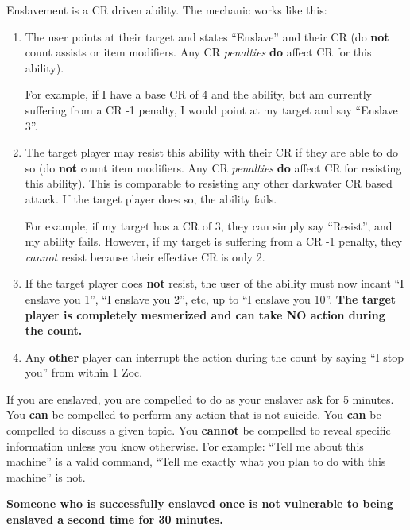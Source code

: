 \documentclass[green]{elementals}
\begin{document}
\name{\gEnslave{}} 

Enslavement is a CR driven ability. The mechanic works like this:

\begin{enumerate}
 \item The user points at their target and states ``Enslave'' and their CR (do {\bf not} count assists or item modifiers. Any CR \emph{penalties} {\bf do} affect CR for this ability). 
 
 For example, if I have a base CR of 4 and the ability, but am currently suffering from a CR -1 penalty, I would point at my target and say ``Enslave 3''. 
 
 \item The target player may resist this ability with their CR if they are able to do so (do {\bf not} count item modifiers. Any CR \emph{penalties} {\bf do} affect CR for resisting this ability). This is comparable to resisting any other darkwater CR based attack. If the target player does so, the ability fails. 
 
 For example, if my target has a CR of 3, they can simply say ``Resist'', and my ability fails.
 However, if my target is suffering from a CR -1 penalty, they \emph{cannot} resist because their effective CR is only 2.
 
 \item If the target player does {\bf not} resist, the user of the ability must now incant ``I enslave you 1'', ``I enslave you 2'', etc, up to ``I enslave you 10''. {\bf The target player is completely mesmerized and can take NO action during the count.}
 
 \item Any {\bf other} player can interrupt the action during the count by saying ``I stop you'' from within 1 Zoc.
\end{enumerate}

If you are enslaved, you are compelled to do as your enslaver ask for 5 minutes. You {\bf can} be compelled to perform any action that is not suicide. You {\bf can} be compelled  to discuss a given topic. You {\bf cannot} be compelled to reveal specific information unless you know otherwise. For example: ``Tell me about this machine'' is a valid command, ``Tell me exactly what you plan to do with this machine'' is not.

{\bf Someone who is successfully enslaved once is not vulnerable to being enslaved a second time for 30 minutes.}
\end{document}
